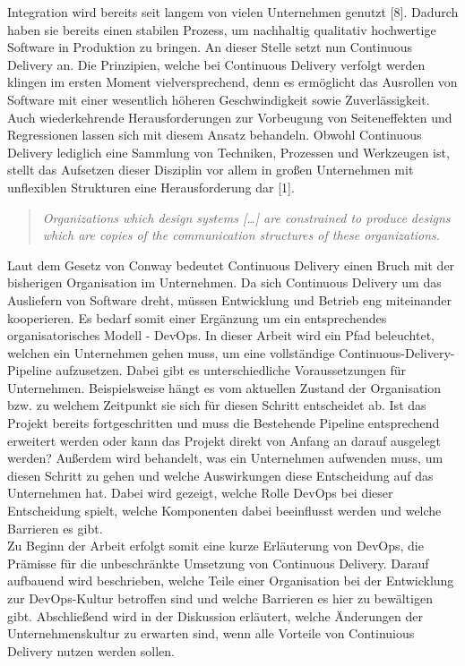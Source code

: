 
 Integration wird bereits seit langem von vielen Unternehmen genutzt [8]. Dadurch haben sie bereits einen stabilen Prozess, um nachhaltig qualitativ hochwertige Software in Produktion zu bringen. An dieser Stelle setzt nun Continuous Delivery an. Die Prinzipien, welche bei Continuous Delivery verfolgt werden klingen im ersten Moment vielversprechend, denn es ermöglicht das Ausrollen von Software mit einer wesentlich höheren Geschwindigkeit sowie Zuverlässigkeit. Auch wiederkehrende Herausforderungen zur Vorbeugung von Seiteneffekten und Regressionen lassen sich mit diesem Ansatz behandeln. Obwohl Continuous Delivery lediglich eine Sammlung von Techniken, Prozessen und Werkzeugen ist, stellt das Aufsetzen dieser Disziplin vor allem in großen Unternehmen mit unflexiblen Strukturen eine Herausforderung dar [1]. 

\begin{quote} \textit{\glqq Organizations which design systems […] are constrained to produce designs which are copies of the communication structures of these organizations. \grqq~}\cite[S.5]{Farley.2011} \end{quote} 

Laut dem Gesetz von Conway bedeutet Continuous Delivery einen Bruch mit der bisherigen Organisation im Unternehmen. Da sich Continuous Delivery um das Ausliefern von Software dreht, müssen Entwicklung und Betrieb eng miteinander kooperieren. Es bedarf somit einer Ergänzung um ein entsprechendes organisatorisches Modell - DevOps. In dieser Arbeit wird ein Pfad beleuchtet, welchen ein Unternehmen gehen muss, um eine vollständige Continuous-Delivery-Pipeline aufzusetzen. Dabei gibt es unterschiedliche Voraussetzungen für Unternehmen. Beispielsweise hängt es vom aktuellen Zustand der Organisation bzw. zu welchem Zeitpunkt sie sich für diesen Schritt entscheidet ab. Ist das Projekt bereits fortgeschritten und muss die Bestehende Pipeline entsprechend erweitert werden oder kann das Projekt direkt von Anfang an darauf ausgelegt werden? Außerdem wird behandelt, was ein Unternehmen aufwenden muss, um diesen Schritt zu gehen und welche Auswirkungen diese Entscheidung auf das Unternehmen hat. Dabei wird gezeigt, welche Rolle DevOps bei dieser Entscheidung spielt, welche Komponenten dabei beeinflusst werden und welche Barrieren es gibt. \\ Zu Beginn der Arbeit erfolgt somit eine kurze Erläuterung von DevOps, die Prämisse für die unbeschränkte Umsetzung von Continuous Delivery. Darauf aufbauend wird beschrieben, welche Teile einer Organisation bei der Entwicklung zur DevOps-Kultur betroffen sind und welche Barrieren es hier zu bewältigen gibt. Abschließend wird in der Diskussion erläutert, welche Änderungen der Unternehmenskultur zu erwarten sind, wenn alle Vorteile von Continuious Delivery nutzen werden sollen.

